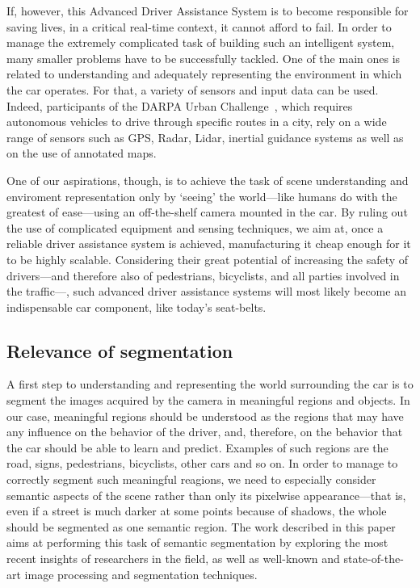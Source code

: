 \documentclass[a4paper, 10pt, conference]{ieeeconf}      %
\begin{document}
If, however, this Advanced Driver Assistance System is to become responsible for saving lives, in a critical real-time context, it cannot afford to fail. In order to manage the extremely complicated task of building such an intelligent system, many smaller problems have to be successfully tackled. One of the main ones is related to understanding and adequately representing the environment in which the car operates. For that, a variety of sensors and input data can be used. Indeed, participants of the DARPA Urban Challenge~\cite{darpa:darpa}, which requires autonomous vehicles to drive through specific routes in a city, rely on a wide range of sensors such as GPS, Radar, Lidar, inertial guidance systems as well as on the use of annotated maps.

One of our aspirations, though, is to achieve the task of scene understanding and enviroment representation only by `seeing' the world---like humans do with the greatest of ease---using an off-the-shelf camera mounted in the car. By ruling out the use of complicated equipment and sensing techniques, we aim at, once a reliable driver assistance system is achieved, manufacturing it cheap enough for it to be highly scalable. Considering their great potential of increasing the safety of drivers---and therefore also of pedestrians, bicyclists, and all parties involved in the traffic---, such advanced driver assistance systems will most likely become an indispensable car component, like today's seat-belts.

\subsection{Relevance of segmentation} 

A first step to understanding and representing the world surrounding the car is to segment the images acquired by the camera in meaningful regions and objects. In our case, meaningful regions should be understood as the regions that may have any influence on the behavior of the driver, and, therefore, on the behavior that the car should be able to learn and predict. Examples of such regions are the road, signs, pedestrians, bicyclists, other cars and so on. In order to manage to correctly segment such meaningful reagions, we need to especially consider semantic aspects of the scene rather than only its pixelwise appearance---that is, even if a street is much darker at some points because of shadows, the whole should be segmented as one semantic region. The work described in this paper aims at performing this task of semantic segmentation by exploring the most recent insights of researchers in the field, as well as well-known and state-of-the-art image processing and segmentation techniques. 
\end{document}

